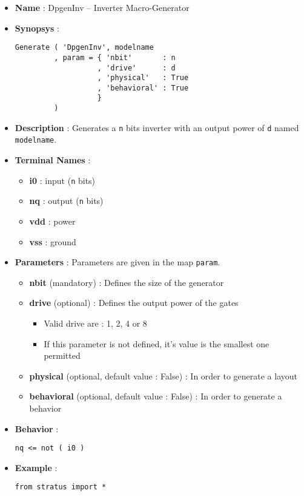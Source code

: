\begin{itemize}
    \item \textbf{Name} : DpgenInv -- Inverter Macro-Generator
    \item \textbf{Synopsys} :
\begin{verbatim}
Generate ( 'DpgenInv', modelname
         , param = { 'nbit'       : n
                   , 'drive'      : d
                   , 'physical'   : True
                   , 'behavioral' : True                   
                   }
         )
\end{verbatim}
    \item \textbf{Description} : Generates a \verb-n- bits inverter with an output power of \verb-d- named \verb-modelname-.
    \item \textbf{Terminal Names} :
    \begin{itemize}
        \item \textbf{i0} : input (\verb-n- bits)
        \item \textbf{nq} : output (\verb-n- bits)
        \item \textbf{vdd} : power
        \item \textbf{vss} : ground
    \end{itemize}
    \item \textbf{Parameters} : Parameters are given in the map \verb-param-.
    \begin{itemize}
        \item \textbf{nbit} (mandatory) : Defines the size of the generator
        \item \textbf{drive} (optional) : Defines the output power of the gates
        \begin{itemize}
            \item Valid drive are : 1, 2, 4 or 8
            \item If this parameter is not defined, it's value is the smallest one permitted
        \end{itemize}
        \item \textbf{physical} (optional, default value : False) : In order to generate a layout
        \item \textbf{behavioral} (optional, default value : False) : In order to generate a behavior        
    \end{itemize}
    \item \textbf{Behavior} :
\begin{verbatim}
nq <= not ( i0 )
\end{verbatim}
    \item \textbf{Example} :
\begin{verbatim}
from stratus import *


\end{verbatim}
\end{itemize}
